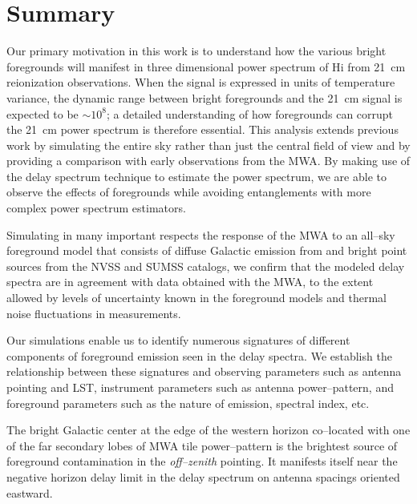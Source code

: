 \documentclass[preprint2,iop,numberedappendix]{emulateapj}
\begin{document}
\section{Summary}\label{sec:summary}

Our primary motivation in this work is to understand how the various bright foregrounds will manifest in three dimensional power spectrum of H{\sc i} from 21~cm reionization observations. When the signal is expressed in units of temperature variance, the dynamic range between bright foregrounds and the 21~cm signal is expected to be $\sim 10^8$; a detailed understanding of how foregrounds can corrupt the 21~cm power spectrum is therefore essential. This analysis extends previous work by simulating the entire sky rather than just the central field of view and by providing a comparison with early observations from the MWA. By making use of the delay spectrum technique to estimate the power spectrum, we are able to observe the effects of foregrounds while avoiding entanglements with more complex power spectrum estimators.  

Simulating in many important respects the response of the MWA to an all--sky foreground model that consists of diffuse Galactic emission from \citet{deo08} and bright point sources from the NVSS and SUMSS catalogs, we confirm that the modeled delay spectra are in agreement with data obtained with the MWA, to the extent allowed by levels of uncertainty known in the foreground models and thermal noise fluctuations in measurements. 

Our simulations enable us to identify numerous signatures of different components of foreground emission seen in the delay spectra. We establish the relationship between these signatures and observing parameters such as antenna pointing and LST, instrument parameters such as antenna power--pattern, and foreground parameters such as the nature of emission, spectral index, etc. 

The bright Galactic center at the edge of the western horizon co--located with one of the far secondary lobes of MWA tile power--pattern is the brightest source of foreground contamination in the {\it off--zenith} pointing. It manifests itself near the negative horizon delay limit in the delay spectrum on antenna spacings oriented eastward. 
\end{document}
